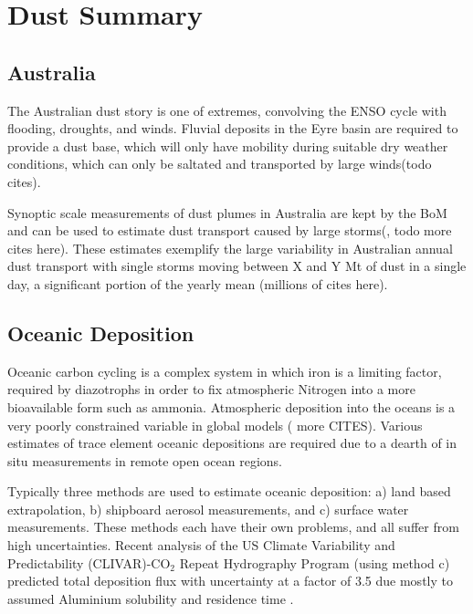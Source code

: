 \section{Dust Summary}

\subsection{Australia}

The Australian dust story is one of extremes, convolving the ENSO cycle with flooding, droughts, and winds.
Fluvial deposits in the Eyre basin are required to provide a dust base, which will only have mobility during suitable dry weather conditions, which can only be saltated and transported by large winds(todo cites).

Synoptic scale measurements of dust plumes in Australia are kept by the BoM and can be used to estimate dust transport caused by large storms(\cite{Leys_2011}, todo more cites here). 
These estimates exemplify the large variability in Australian annual dust transport with single storms moving between X and Y Mt of dust in a single day, a significant portion of the yearly mean (millions of cites here).

\subsection{Oceanic Deposition}
Oceanic carbon cycling is a complex system in which iron is a limiting factor, required by diazotrophs in order to fix atmospheric Nitrogen into a more bioavailable form such as ammonia. 
Atmospheric deposition into the oceans is a very poorly constrained variable in global models (\cite{Grand_2015} more CITES). 
Various estimates of trace element oceanic depositions are required due to a dearth of in situ measurements in remote open ocean regions.

Typically three methods are used to estimate oceanic deposition: a) land based extrapolation, b) shipboard aerosol measurements, and c) surface water measurements. 
These methods each have their own problems, and all suffer from high uncertainties. 
Recent analysis of the US Climate Variability and Predictability (CLIVAR)-CO$_2$ Repeat Hydrography Program (using method c) predicted total deposition flux with uncertainty at a factor of 3.5 due mostly to assumed Aluminium solubility and residence time \cite{Grand_2015}.
  

  